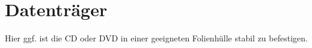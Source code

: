 
\chapter*{Datenträger}\thispagestyle{fancy}\markboth{}{}

Hier ggf. ist die CD oder DVD in einer geeigneten Folienhülle stabil zu befestigen.
